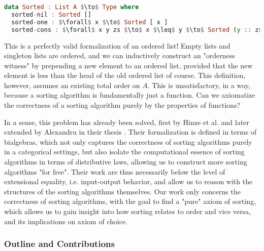 \begin{lstlisting}[language=Haskell]
data Sorted : List A $\to$ Type where
  sorted-nil : Sorted []
  sorted-one : $\forall$ x $\to$ Sorted [ x ]
  sorted-cons : $\forall$ x y zs $\to$ x $\leq$ y $\to$ Sorted (y :: zs) $\to$ Sorted (x :: y :: zs)
\end{lstlisting}

This is a perfectly valid formalization of an ordered list! Empty lists and singleton lists
are ordered, and we can inductively construct an "orderness witness" by prepending a new element
to an ordered list, provided that the new element is less than the head of the old ordered list of
course. This definition, however, assumes an existing total order on $A$. This is
unsatisfactory, in a way, because a sorting algorithm is fundamentally just a function. Can we
axiomatize the correctness of a sorting algorithm purely by the properties of functions?

In a sense, this problem has already been solved, first by Hinze et al. \cite{10.1145/2364394.2364405}
and later extended by Alexandru in their thesis \cite{alexandru_intrinsically_2023}.
Their formalization is defined in terms of bialgebras, which not
only captures the correctness of sorting algorithms purely in a categorical settings, but
also isolate the computational essence of sorting algorithms in terms of distributive laws,
allowing us to construct more sorting algorithms "for free". Their work are thus necessarily
below the level of extensional equality, i.e. input-output behavior, and allow us to reason
with the structures of the sorting algorithms themselves. Our work only concerns the correctness
of sorting algorithms, with the goal to find a "pure" axiom of sorting, which allows us to gain
insight into how sorting relates to order and vice versa, and its implications on axiom of
choice. %

\subsubsection*{Outline and Contributions}

